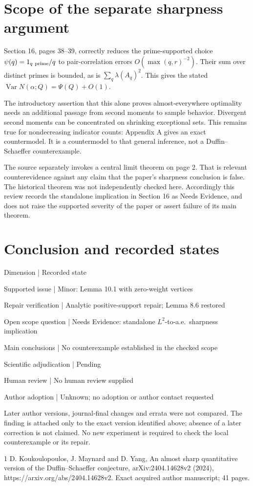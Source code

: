 \documentclass[10pt]{article}
\begin{document}
\section*{Scope of the separate sharpness argument}
Section 16, pages 38–39, correctly reduces the prime-supported choice \(\psi(q)=1_{q\ {\rm prime}}/q\) to pair-correlation errors \(O(\max(q,r)^{-2})\). Their sum over distinct primes is bounded, as is \(\sum_q\lambda(A_q)^2\). This gives the stated \(\operatorname{Var}N(\alpha;Q)=\Psi(Q)+O(1)\).\par
The introductory assertion that this alone proves almost-everywhere optimality needs an additional passage from second moments to sample behavior. Divergent second moments can be concentrated on shrinking exceptional sets. This remains true for nondecreasing indicator counts: Appendix A gives an exact countermodel. It is a countermodel to that general inference, not a Duffin–Schaeffer counterexample.\par
The source separately invokes a central limit theorem on page 2. That is relevant counterevidence against any claim that the paper’s sharpness conclusion is false. The historical theorem was not independently checked here. Accordingly this review records the standalone implication in Section 16 as Needs Evidence, and does not raise the supported severity of the paper or assert failure of its main theorem.\par
\section*{Conclusion and recorded states}
Dimension | Recorded state\par
Supported issue | Minor: Lemma 10.1 with zero-weight vertices\par
Repair verification | Analytic positive-support repair; Lemma 8.6 restored\par
Open scope question | Needs Evidence: standalone \(L^2\)-to-a.e. sharpness implication\par
Main conclusions | No counterexample established in the checked scope\par
Scientific adjudication | Pending\par
Human review | No human review supplied\par
Author adoption | Unknown; no adoption or author contact requested\par
Later author versions, journal-final changes and errata were not compared. The finding is attached only to the exact version identified above; absence of a later correction is not claimed. No new experiment is required to check the local counterexample or its repair.\par
1 D. Koukoulopoulos, J. Maynard and D. Yang, An almost sharp quantitative version of the Duffin–Schaeffer conjecture, arXiv:2404.14628v2 (2024), https://arxiv.org/abs/2404.14628v2. Exact acquired author manuscript; 41 pages.\par
\end{document}
